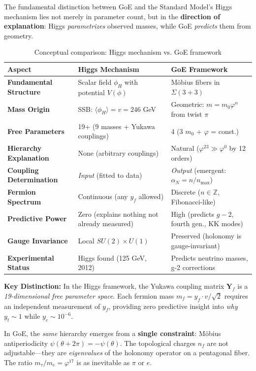 \documentclass[12pt]{article}
\begin{document}
The fundamental distinction between GoE and the Standard Model's Higgs mechanism lies not merely in parameter count, but in the \textbf{direction of explanation}: Higgs \textit{parametrizes} observed masses, while GoE \textit{predicts} them from geometry.

\begin{table}[H]
\centering
\caption{Conceptual comparison: Higgs mechanism vs. GoE framework}
\small
\begin{tabular}{p{3.5cm}p{5cm}p{5cm}}
\toprule
\textbf{Aspect} & \textbf{Higgs Mechanism} & \textbf{GoE Framework} \\
\midrule
\textbf{Fundamental Structure} & Scalar field $\phi_H$ with potential $V(\phi)$ & M\"obius fibers in $\Sigma(3+3)$ \\
\textbf{Mass Origin} & SSB: $\langle\phi_H\rangle = v = 246$ GeV & Geometric: $m = m_0 \varphi^n$ from twist $\pi$ \\
\textbf{Free Parameters} & 19+ (9 masses + Yukawa couplings) & 4 (3 $m_0$ + $\varphi$ = const.) \\
\textbf{Hierarchy Explanation} & None (arbitrary couplings) & Natural ($\varphi^{23} \gg \varphi^0$ by 12 orders) \\
\textbf{Coupling Determination} & \textit{Input} (fitted to data) & \textit{Output} (emergent: $\alpha_N = n/n_{\max}$) \\
\textbf{Fermion Spectrum} & Continuous (any $y_f$ allowed) & Discrete ($n \in \mathbb{Z}$, Fibonacci-like) \\
\textbf{Predictive Power} & Zero (explains nothing not already measured) & High (predicts $g-2$, fourth gen., KK modes) \\
\textbf{Gauge Invariance} & Local $SU(2) \times U(1)$ & Preserved (holonomy is gauge-invariant) \\
\textbf{Experimental Status} & Higgs found (125 GeV, 2012) & Predicts neutrino masses, g-2 corrections \\
\bottomrule
\end{tabular}
\label{tab:higgs_vs_goe}
\end{table}

\textbf{Key Distinction:} In the Higgs framework, the Yukawa coupling matrix $\mathbf{Y}_f$ is a \textit{19-dimensional free parameter space}. Each fermion mass $m_f = y_f \cdot v / \sqrt{2}$ requires an independent measurement of $y_f$, providing zero predictive insight into \textit{why} $y_t \sim 1$ while $y_e \sim 10^{-6}$.

In GoE, the \textit{same} hierarchy emerges from a \textbf{single constraint}: M\"obius antiperiodicity $\psi(\theta+2\pi) = -\psi(\theta)$. The topological charges $n_f$ are not adjustable—they are \textit{eigenvalues} of the holonomy operator on a pentagonal fiber. The ratio $m_\tau/m_e = \varphi^{17}$ is as inevitable as $\pi$ or $e$.
\end{document}
